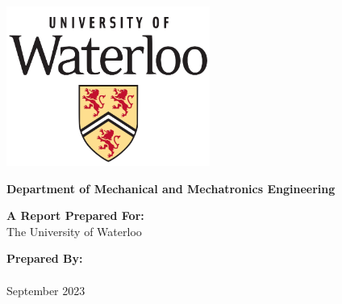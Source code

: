 \thispagestyle{empty}
\begin{center}
    \textbf{\reportTitle}
\end{center}
\vspace{1cm}
\begin{center}
    \begin{center}
        \includegraphics[width=0.5\textwidth]{content/images/uw-icon.png}
    \end{center}
    \textbf{Department of Mechanical and Mechatronics Engineering}
\end{center}




\vspace*{\fill}
    \begin{center}
        \textbf{A Report Prepared For:}\\
        The University of Waterloo
    \end{center}
\vspace*{\fill}

\begin{center}
    \textbf{Prepared By:}\\
    \name \\
    September 2023
\end{center}

\newpage